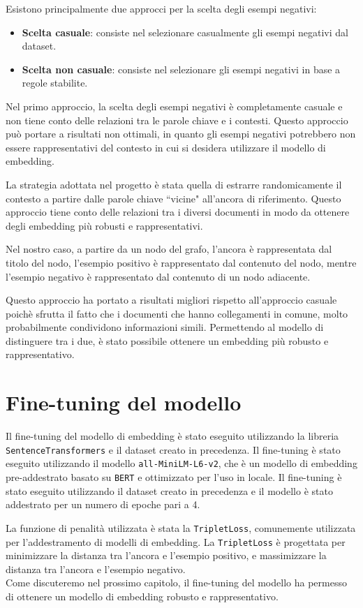 Esistono principalmente due approcci per la scelta degli
esempi negativi:

\begin{itemize}
      \item \textbf{Scelta casuale}: consiste nel selezionare
            casualmente gli esempi negativi dal dataset.
      \item \textbf{Scelta non casuale}: consiste nel
            selezionare gli esempi negativi in base a regole
            stabilite.
\end{itemize}

Nel primo approccio, la scelta degli esempi negativi è
completamente casuale e non tiene conto delle relazioni tra
le parole chiave e i contesti.
Questo approccio può portare a risultati non ottimali, in
quanto gli esempi negativi potrebbero non essere
rappresentativi del contesto in cui si desidera utilizzare
il modello di embedding.

La strategia adottata nel progetto è stata quella di
estrarre randomicamente il contesto a partire dalle parole
chiave ``vicine" all'ancora di riferimento.
Questo approccio tiene conto delle relazioni tra i diversi
documenti in modo da ottenere degli embedding più robusti e
rappresentativi.

Nel nostro caso, a partire da un nodo del grafo, l'ancora è
rappresentata dal titolo del nodo, l'esempio positivo è
rappresentato dal contenuto del nodo, mentre l'esempio
negativo è rappresentato dal contenuto di un nodo
adiacente.

Questo approccio ha portato a risultati migliori rispetto
all'approccio casuale poichè sfrutta il fatto che i
documenti che hanno collegamenti in comune, molto
probabilmente condividono informazioni simili.
Permettendo al modello di distinguere tra i due, è stato
possibile ottenere un embedding più robusto e
rappresentativo.

\section{Fine-tuning del modello}
\label{sec:fine_tuning}
Il fine-tuning del modello di embedding è stato eseguito
utilizzando la libreria \texttt{SentenceTransformers} e il
dataset creato in precedenza.
Il fine-tuning è stato eseguito utilizzando il modello
\texttt{all-MiniLM-L6-v2}, che è un modello di embedding
pre-addestrato basato su \texttt{BERT} e ottimizzato per
l'uso in locale.
Il fine-tuning è stato eseguito utilizzando il dataset
creato in precedenza e il modello è stato addestrato per un
numero di epoche pari a 4.

La funzione di penalità utilizzata è stata la
\texttt{TripletLoss}\cite{hermans2017defense}, comunemente
utilizzata per l'addestramento di modelli di embedding.
La \texttt{TripletLoss} è progettata per minimizzare la
distanza tra l'ancora e l'esempio positivo, e massimizzare
la distanza tra l'ancora e l'esempio negativo.
\\

\noindent
Come discuteremo nel prossimo capitolo, il fine-tuning del
modello ha permesso di ottenere un modello di embedding
robusto e rappresentativo.
